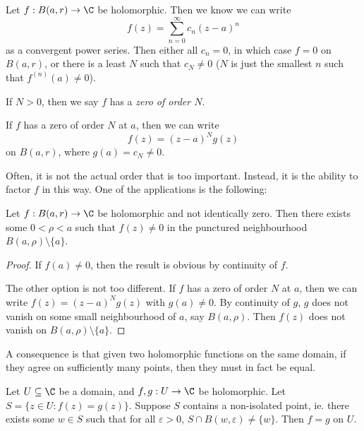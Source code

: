 \documentclass[a4paper]{article}
\begin{document}
\begin{defi}
  Let $f: B(a, r) \to \C$ be holomorphic. Then we know we can write
  \[
    f(z) = \sum_{n = 0}^\infty c_n (z - a)^n
  \]
  as a convergent power series. Then either all $c_n = 0$, in which case $f = 0$ on $B(a, r)$, or there is a least $N$ such that $c_N \not =0$ ($N$ is just the smallest $n$ such that $f^{(n)} (a) \not= 0$).

  If $N > 0$, then we say $f$ has a \emph{zero of order $N$}.
\end{defi}
If $f$ has a zero of order $N$ at $a$, then we can write
\[
  f(z) = (z - a)^N g(z)
\]
on $B(a, r)$, where $g(a) = c_N \not= 0$.

Often, it is not the actual order that is too important. Instead, it is the ability to factor $f$ in this way. One of the applications is the following:
\begin{lemma}
  Let $f: B(a, r) \to \C$ be holomorphic and not identically zero. Then there exists some $0 < \rho < a$ such that $f(z) \not= 0$ in the punctured neighbourhood $B(a, \rho) \setminus \{a\}$.
\end{lemma}

\begin{proof}
  If $f(a) \not= 0$, then the result is obvious by continuity of $f$.

  The other option is not too different. If $f$ has a zero of order $N$ at $a$, then we can write $f(z) = (z - a)^N g(z)$ with $g(a) \not= 0$. By continuity of $g$, $g$ does not vanish on some small neighbourhood of $a$, say $B(a, \rho)$. Then $f(z)$ does not vanish on $B(a, \rho) \setminus \{a\}$.
\end{proof}

A consequence is that given two holomorphic functions on the same domain, if they agree on sufficiently many points, then they must in fact be equal.
\begin{cor}
  Let $U \subseteq \C$ be a domain, and $f, g: U \to \C$ be holomorphic. Let $S = \{z \in U: f(z) = g(z)\}$. Suppose $S$ contains a non-isolated point, ie. there exists some $w \in S$ such that for all $\varepsilon > 0$, $S \cap B(w, \varepsilon) \not= \{w\}$. Then $f = g$ on $U$.
\end{cor}
\end{document}
